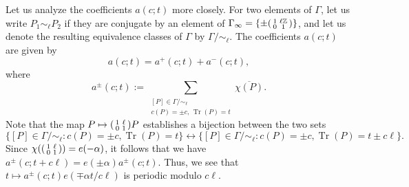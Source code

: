 \documentclass{article}
\theoremstyle{named}
\newcommand{\Z}{\mathbb{Z}}
\DeclareMathOperator{\Tr}{Tr}
\begin{document}
Let us analyze the coefficients $a(c; t)$ more closely. For two elements of $\Gamma$, let us write $P_1 \sim_\ell P_2$ if they are conjugate by an element of $\Gamma_\infty = \{\pm \begin{psmallmatrix}
    1 & \ell\Z\\
    0 & 1
\end{psmallmatrix}\}$, and let us denote the resulting equivalence classes of $\Gamma$ by $\Gamma/\sim_\ell$. The coefficients $a(c; t)$ are given by
\begin{equation*}
    a(c; t) = a^+(c; t) + a^{-}(c; t),
\end{equation*}
where
\begin{equation*}
    a^{\pm}(c; t) := \sum_{\substack{[P] \in \Gamma/\sim_\ell\\
    c(P) = \pm c, \, \Tr(P) = t}} \overline{\chi(P)}.
\end{equation*}
Note that the map $P \mapsto \begin{psmallmatrix}
    1 & \ell\\
    0 & 1
\end{psmallmatrix}P$ establishes a bijection between the two sets
\begin{equation*}
    \{[P] \in \Gamma/\sim_\ell : c(P) = \pm c, \Tr(P) = t\} \longleftrightarrow \{[P] \in \Gamma/\sim_\ell : c(P) = \pm c, \Tr(P) = t \pm c\ell\}.
\end{equation*}
Since $\chi(\begin{psmallmatrix}
    1 & \ell\\
    0 & 1
\end{psmallmatrix}) = e(-\alpha)$, it follows that we have $a^{\pm}(c; t + c\ell) = e(\pm \alpha)a^{\pm}(c; t)$. Thus, we see that
$t \mapsto a^\pm(c; t)e(\mp \alpha t/c\ell)$ is periodic modulo $c\ell$. 
\end{document}
